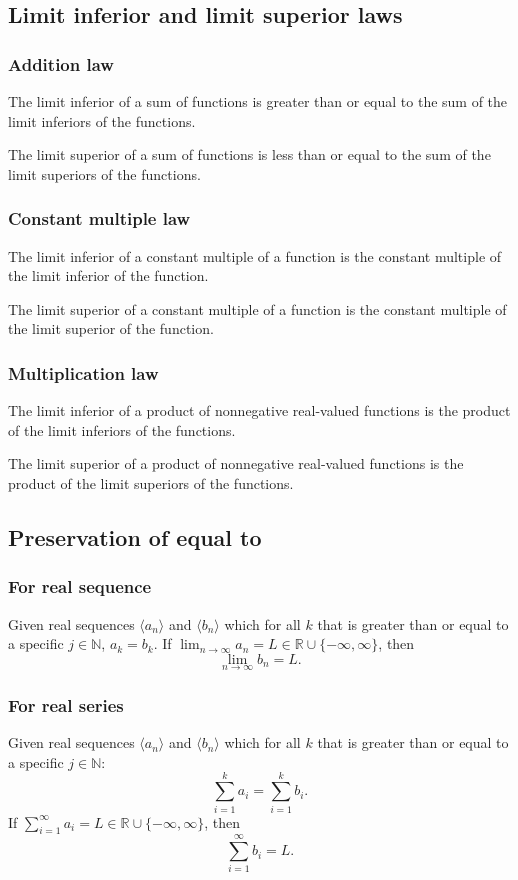 \subsection{Limit inferior and limit superior laws}
\subsubsection{Addition law}
The limit inferior of a sum of functions is greater than or equal to the sum of the limit inferiors of the functions.

The limit superior of a sum of functions is less than or equal to the sum of the limit superiors of the functions.
\subsubsection{Constant multiple law}
The limit inferior of a constant multiple of a function is the constant multiple of the limit inferior of the function.

The limit superior of a constant multiple of a function is the constant multiple of the limit superior of the function.
\subsubsection{Multiplication law}
The limit inferior of a product of nonnegative real-valued functions is the product of the limit inferiors of the functions.

The limit superior of a product of nonnegative real-valued functions is the product of the limit superiors of the functions.
\subsection{Preservation of equal to}
\subsubsection{For real sequence}
Given real sequences $\langle a_n\rangle$ and $\langle b_n\rangle$ which for all $k$ that is greater than or equal to a specific $j\in \mathbb{N}$, $a_k=b_k$. If $\lim_{n\to\infty}a_n=L\in\mathbb{R}\cup\{-\infty,\infty\}$, then
\[\lim_{n\to\infty}b_n=L.\]
\subsubsection{For real series}
Given real sequences $\langle a_n\rangle$ and $\langle b_n\rangle$ which for all $k$ that is greater than or equal to a specific $j\in \mathbb{N}$:
\[\sum_{i=1}^ka_i=\sum_{i=1}^kb_i.\]
If $\sum_{i=1}^{\infty}a_i=L\in\mathbb{R}\cup\{-\infty,\infty\}$, then
\[\sum_{i=1}^{\infty}b_i=L.\]

